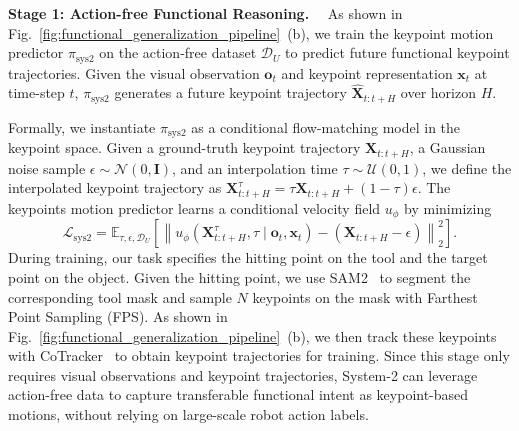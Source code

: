 \textbf{Stage 1: Action-free Functional Reasoning.}~~ 
As shown in Fig.~\ref{fig:functional_generalization_pipeline}~(b), we train the keypoint motion predictor $\pi_{\mathrm{sys2}}$ on the action-free dataset $\mathcal{D}_{U}$ to predict future functional keypoint trajectories. 
Given the visual observation $\mathbf{o}_t$ and keypoint representation $\mathbf{x}_t$ at time-step $t$, $\pi_{\mathrm{sys2}}$  generates a future keypoint trajectory $\hat{\mathbf{X}}_{t:t+H}$ over horizon $H$. 

Formally, we instantiate $\pi_{\mathrm{sys2}}$ as a conditional flow-matching model in the keypoint space.
Given a ground-truth keypoint trajectory $\mathbf{X}_{t:t+H}$, a Gaussian noise sample $\epsilon\sim\mathcal{N}(0,\mathbf{I})$, and an interpolation time $\tau\sim\mathcal{U}(0,1)$, we define the interpolated keypoint trajectory as
$\mathbf{X}_{t:t+H}^{\tau}=\tau \mathbf{X}_{t:t+H} + (1-\tau)\epsilon
$.
The keypoints motion predictor learns a conditional velocity field $u_{\phi}$ by minimizing
\begin{equation}
    \mathcal{L}_{\mathrm{sys2}}
    =
    \mathbb{E}_{\tau,\epsilon,\mathcal{D}_{U}}
    \left[
    \left\|
    u_{\phi}
    \left(
    \mathbf{X}_{t:t+H}^{\tau}, \tau
    \mid
    \mathbf{o}_t, \mathbf{x}_t
    \right)
    -
    \left(
    \mathbf{X}_{t:t+H}-\epsilon
    \right)
    \right\|_2^2
    \right].
    \label{eq:sys2_flow_matching}
\end{equation}
During training, our task specifies the hitting point on the tool and the target point on the object. 
Given the hitting point, we use SAM2~\cite{ravi2025sam} to segment the corresponding tool mask and sample $N$ keypoints on the mask with Farthest Point Sampling (FPS). 
As shown in Fig.~\ref{fig:functional_generalization_pipeline}~(b), we then track these keypoints with CoTracker~\cite{karaev2024cotracker} to obtain keypoint trajectories for training. 
Since this stage only requires visual observations and keypoint trajectories, System-2 can leverage action-free data to capture transferable functional intent as keypoint-based motions, without relying on large-scale robot action labels.

